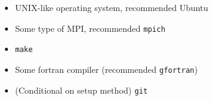 \begin{itemize}
    \item UNIX-like operating system, recommended Ubuntu
    \item Some type of MPI, recommended {\tt mpich}
    \item {\tt make}
    \item Some fortran compiler (recommended {\tt gfortran})
    \item (Conditional on setup method) {\tt git}
\end{itemize}